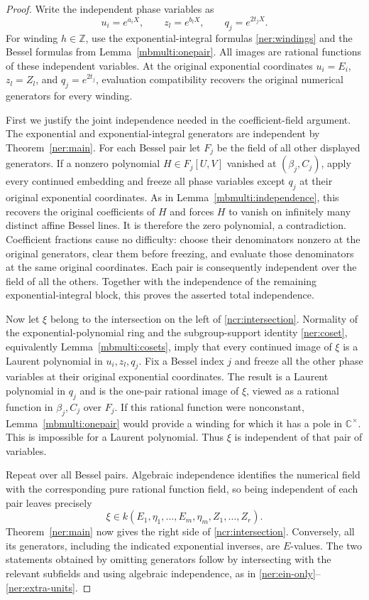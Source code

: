\documentclass[11pt]{article}
\theoremstyle{definition}
\theoremstyle{remark}
\begin{document}
\begin{proof}
Write the independent phase variables as
\[
 u_i=e^{a_iX},\qquad z_l=e^{b_lX},\qquad q_j=e^{2t_jX}.
\]
For winding $h\in\mathbb Z$, use the exponential-integral formulas
\eqref{ner:windings} and the Bessel formulas from
Lemma~\ref{mbmulti:onepair}. All images are rational functions of
these independent variables. At the original exponential coordinates
$u_i=E_i$, $z_l=Z_l$, and $q_j=e^{2t_j}$, evaluation compatibility
recovers the original numerical generators for every winding.

First we justify the joint independence needed in the coefficient-field
argument. The exponential and exponential-integral generators are
independent by Theorem~\ref{ner:main}. For each Bessel pair let $F_j$
be the field of all other displayed generators. If a nonzero polynomial
$H\in F_j[U,V]$ vanished at $(\beta_j,C_j)$, apply every continued
embedding and freeze all phase variables except $q_j$ at their original
exponential coordinates. As in Lemma~\ref{mbmulti:independence}, this
recovers the original coefficients of $H$ and forces $H$ to vanish on
infinitely many distinct affine Bessel lines. It is therefore the zero
polynomial, a contradiction. Coefficient fractions cause no difficulty:
choose their denominators nonzero at the original generators, clear
them before freezing, and evaluate those denominators at the same
original coordinates. Each pair is consequently independent over the
field of all the others. Together with the independence of the remaining
exponential-integral block, this proves the asserted total independence.

Now let $\xi$ belong to the intersection on the left of
\eqref{ncr:intersection}. Normality of the exponential-polynomial ring
and the subgroup-support identity \eqref{ner:coset}, equivalently
Lemma~\ref{mbmulti:cosets}, imply that every continued image of $\xi$
is a Laurent polynomial in $u_i,z_l,q_j$. Fix a Bessel index $j$ and
freeze all the other phase variables at their original exponential
coordinates. The result is a Laurent polynomial in $q_j$ and is the
one-pair rational image of $\xi$, viewed as a rational function in
$\beta_j,C_j$ over $F_j$. If this rational function were nonconstant,
Lemma~\ref{mbmulti:onepair} would provide a winding for which it has
a pole in $\mathbb C^\times$. This is impossible for a Laurent
polynomial. Thus $\xi$ is independent of that pair of variables.

Repeat over all Bessel pairs. Algebraic independence identifies the
numerical field with the corresponding pure rational function field,
so being independent of each pair leaves precisely
\[
 \xi\in k(E_1,\eta_1,\ldots,E_m,\eta_m,Z_1,\ldots,Z_r).
\]
Theorem~\ref{ner:main} now gives the right side of
\eqref{ncr:intersection}. Conversely, all its generators, including
the indicated exponential inverses, are $E$-values. The two statements
obtained by omitting generators follow by intersecting with the relevant
subfields and using algebraic independence, as in
\eqref{ner:ein-only}--\eqref{ner:extra-units}.
\end{proof}
\end{document}
